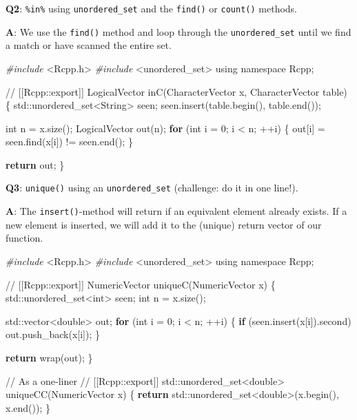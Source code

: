 \documentclass[
]{krantz}
\makeatletter
\newenvironment{Shaded}{\begin{snugshade}}{\end{snugshade}}
\newcommand{\BuiltInTok}[1]{#1}
\newcommand{\CommentTok}[1]{\textcolor[rgb]{0.56,0.35,0.01}{\textit{#1}}}
\newcommand{\ControlFlowTok}[1]{\textcolor[rgb]{0.13,0.29,0.53}{\textbf{#1}}}
\newcommand{\DataTypeTok}[1]{\textcolor[rgb]{0.13,0.29,0.53}{#1}}
\newcommand{\DecValTok}[1]{\textcolor[rgb]{0.00,0.00,0.81}{#1}}
\newcommand{\ImportTok}[1]{#1}
\newcommand{\KeywordTok}[1]{\textcolor[rgb]{0.13,0.29,0.53}{\textbf{#1}}}
\newcommand{\NormalTok}[1]{#1}
\newcommand{\PreprocessorTok}[1]{\textcolor[rgb]{0.56,0.35,0.01}{\textit{#1}}}
\newenvironment{kframe}{%
\medskip{}
\setlength{\fboxsep}{.8em}
 \def\at@end@of@kframe{}%
 \ifinner\ifhmode%
  \def\at@end@of@kframe{\end{minipage}}%
  \begin{minipage}{\columnwidth}%
 \fi\fi%
 \def\FrameCommand##1{\hskip\@totalleftmargin \hskip-\fboxsep
 \colorbox{shadecolor}{##1}\hskip-\fboxsep
     \hskip-\linewidth \hskip-\@totalleftmargin \hskip\columnwidth}%
 \MakeFramed {\advance\hsize-\width
   \@totalleftmargin\z@ \linewidth\hsize
   \@setminipage}}%
 {\par\unskip\endMakeFramed%
 \at@end@of@kframe}
\renewenvironment{Shaded}{\begin{kframe}}{\end{kframe}}
\renewcommand{\KeywordTok} [1]{\textcolor[rgb]{0.00,0.44,0.13}{{#1}}}
\renewcommand{\DataTypeTok}[1]{\textcolor[rgb]{0.56,0.13,0.00}{{#1}}}
\renewcommand{\DecValTok}  [1]{\textcolor[rgb]{0.25,0.63,0.44}{{#1}}}
\renewcommand{\CommentTok} [1]{\textcolor[rgb]{0.38,0.63,0.69}{{#1}}}
\renewcommand{\NormalTok}  [1]{{#1}}
\makeatother
\begin{document}
\textbf{{Q2}}: \texttt{\%in\%} using \texttt{unordered\_set} and the \texttt{find()} or \texttt{count()} methods.

\textbf{{A}}: We use the \texttt{find()} method and loop through the \texttt{unordered\_set} until we find a match or have scanned the entire set.

\begin{Shaded}
\begin{Highlighting}[]
\PreprocessorTok{#include }\ImportTok{<Rcpp.h>}
\PreprocessorTok{#include }\ImportTok{<unordered_set>}
\KeywordTok{using} \KeywordTok{namespace}\NormalTok{ Rcpp;}

\CommentTok{// [[Rcpp::export]]}
\NormalTok{LogicalVector inC(CharacterVector x, CharacterVector table) \{}
  \BuiltInTok{std::}\NormalTok{unordered_set<String> seen;}
\NormalTok{  seen.insert(table.begin(), table.end());}
  
  \DataTypeTok{int}\NormalTok{ n = x.size();}
\NormalTok{  LogicalVector out(n);}
  \ControlFlowTok{for}\NormalTok{ (}\DataTypeTok{int}\NormalTok{ i = }\DecValTok{0}\NormalTok{; i < n; ++i) \{}
\NormalTok{    out[i] = seen.find(x[i]) != seen.end();}
\NormalTok{  \}}
  
  \ControlFlowTok{return}\NormalTok{ out;}
\NormalTok{\}}
\end{Highlighting}
\end{Shaded}

\textbf{{Q3}}: \texttt{unique()} using an \texttt{unordered\_set} (challenge: do it in one line!).

\textbf{{A}}: The \texttt{insert()}-method will return if an equivalent element already exists. If a new element is inserted, we will add it to the (unique) return vector of our function.

\begin{Shaded}
\begin{Highlighting}[]
\PreprocessorTok{#include }\ImportTok{<Rcpp.h>}
\PreprocessorTok{#include }\ImportTok{<unordered_set>}
\KeywordTok{using} \KeywordTok{namespace}\NormalTok{ Rcpp;}

\CommentTok{// [[Rcpp::export]]}
\NormalTok{NumericVector uniqueC(NumericVector x) \{}
  \BuiltInTok{std::}\NormalTok{unordered_set<}\DataTypeTok{int}\NormalTok{> seen;}
  \DataTypeTok{int}\NormalTok{ n = x.size();}
  
  \BuiltInTok{std::}\NormalTok{vector<}\DataTypeTok{double}\NormalTok{> out;}
  \ControlFlowTok{for}\NormalTok{ (}\DataTypeTok{int}\NormalTok{ i = }\DecValTok{0}\NormalTok{; i < n; ++i) \{}
    \ControlFlowTok{if}\NormalTok{ (seen.insert(x[i]).second) out.push_back(x[i]);}
\NormalTok{  \}}
  
  \ControlFlowTok{return}\NormalTok{ wrap(out);}
\NormalTok{\}}


\CommentTok{// As a one-liner}
\CommentTok{// [[Rcpp::export]]}
\BuiltInTok{std::}\NormalTok{unordered_set<}\DataTypeTok{double}\NormalTok{> uniqueCC(NumericVector x) \{}
  \ControlFlowTok{return} \BuiltInTok{std::}\NormalTok{unordered_set<}\DataTypeTok{double}\NormalTok{>(x.begin(), x.end());}
\NormalTok{\}}
\end{Highlighting}
\end{Shaded}
\end{document}
